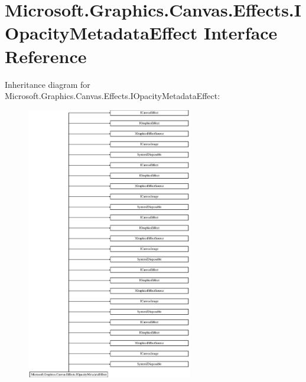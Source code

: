 \hypertarget{interface_microsoft_1_1_graphics_1_1_canvas_1_1_effects_1_1_i_opacity_metadata_effect}{}\section{Microsoft.\+Graphics.\+Canvas.\+Effects.\+I\+Opacity\+Metadata\+Effect Interface Reference}
\label{interface_microsoft_1_1_graphics_1_1_canvas_1_1_effects_1_1_i_opacity_metadata_effect}
Inheritance diagram for Microsoft.\+Graphics.\+Canvas.\+Effects.\+I\+Opacity\+Metadata\+Effect\+:\begin{figure}[H]
\begin{center}
\leavevmode
\includegraphics[height=12.000000cm]{interface_microsoft_1_1_graphics_1_1_canvas_1_1_effects_1_1_i_opacity_metadata_effect}
\end{center}
\end{figure}
